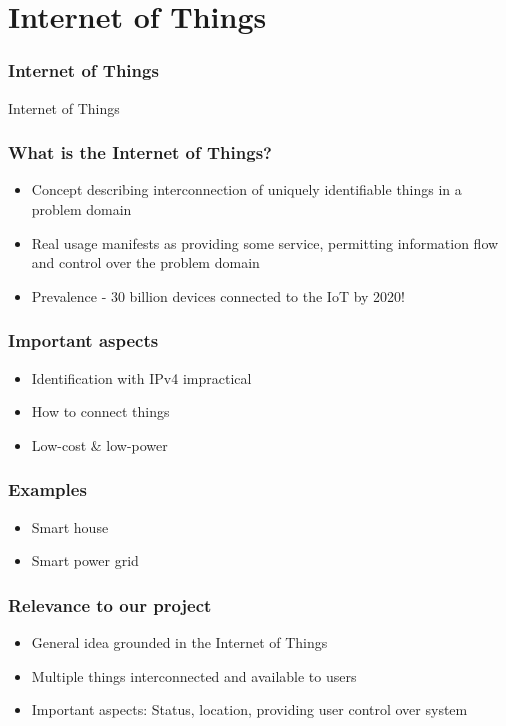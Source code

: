 \section{Internet of Things}

\begin{frame}
\frametitle{Internet of Things}
\centering
\Huge Internet of Things
\end{frame}

\begin{frame}
\frametitle{What is the Internet of Things?}
\begin{itemize}
\item Concept describing interconnection of uniquely identifiable things in a problem domain
\item Real usage manifests as providing some service, permitting information flow and control over the problem domain
\item Prevalence - 30 billion devices connected to the IoT by 2020!
\end{itemize}
\end{frame}

\begin{frame}
\frametitle{Important aspects}
\begin{itemize}
\item Identification with IPv4 impractical
\item How to connect things
\item Low-cost \& low-power
\end{itemize}
\end{frame}

\begin{frame}
\frametitle{Examples}
\begin{itemize}
\item Smart house
\item Smart power grid
\end{itemize}
\end{frame}

\begin{frame}
\frametitle{Relevance to our project}
\begin{itemize}
\item General idea grounded in the Internet of Things
\item Multiple things interconnected and available to users
\item Important aspects: Status, location, providing user control over system
\end{itemize}
\end{frame}

